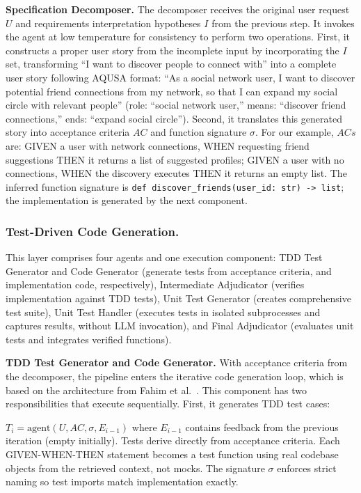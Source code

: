\documentclass[sigconf,screen]{acmart}
\begin{document}
\textbf{Specification Decomposer.} The decomposer receives the original user request $U$ and requirements interpretation hypotheses $I$ from the previous step. It invokes the agent at low temperature for consistency to perform two operations. First, it constructs a proper user story from the incomplete input by incorporating the $I$ set, transforming ``I want to discover people to connect with'' into a complete user story following AQUSA format: ``As a social network user, I want to discover potential friend connections from my network, so that I can expand my social circle with relevant people'' (role: ``social network user,'' means: ``discover friend connections,'' ends: ``expand social circle''). Second, it translates this generated story into acceptance criteria $AC$ and function signature $\sigma$. For our example, $ACs$ are: GIVEN a user with network connections, WHEN requesting friend suggestions THEN it returns a list of suggested profiles; GIVEN a user with no connections, WHEN the discovery executes THEN it returns an empty list. The inferred function signature is \texttt{def discover\_friends(user\_id: str) -> list}; the implementation is generated by the next component.

\subsubsection{Test-Driven Code Generation.}
This layer comprises four agents and one execution component: TDD Test Generator and Code Generator (generate tests from acceptance criteria, and implementation code, respectively), Intermediate Adjudicator (verifies implementation against TDD tests), Unit Test Generator (creates comprehensive test suite), Unit Test Handler (executes tests in isolated subprocesses and captures results, without LLM invocation), and Final Adjudicator (evaluates unit tests and integrates verified functions).

\textbf{TDD Test Generator and Code Generator.} With acceptance criteria from the decomposer, the pipeline enters the iterative code generation loop, which is based on the architecture from Fahim et al.~\cite{fahim2026selfevolve}. This component has two responsibilities that execute sequentially. First, it generates TDD test cases:

$T_i = \text{agent}(U, AC, \sigma, E_{i-1})$ where $E_{i-1}$ contains feedback from the previous iteration (empty initially). Tests derive directly from acceptance criteria. Each GIVEN-WHEN-THEN statement becomes a test function using real codebase objects from the retrieved context, not mocks. The signature $\sigma$ enforces strict naming so test imports match implementation exactly.
\end{document}

